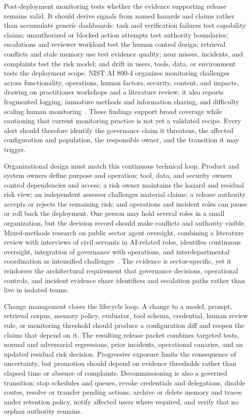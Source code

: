 Post-deployment monitoring tests whether the evidence supporting release remains valid. It should derive signals from named hazards and claims rather than accumulate generic dashboards: task and verification failures test capability claims; unauthorized or blocked action attempts test authority boundaries; escalations and reviewer workload test the human control design; retrieval conflicts and stale memory use test evidence quality; near misses, incidents, and complaints test the risk model; and drift in users, tools, data, or environment tests the deployment scope. NIST AI 800-4 organizes monitoring challenges across functionality, operations, human factors, security, content, and impacts, drawing on practitioner workshops and a literature review; it also reports fragmented logging, immature methods and information sharing, and difficulty scaling human monitoring~\cite{rao2026monitoring}. These findings support broad coverage while cautioning that current monitoring practice is not yet a validated recipe. Every alert should therefore identify the governance claim it threatens, the affected configuration and population, the responsible owner, and the transition it may trigger.

Organizational design must match this continuous technical loop. Product and system owners define purpose and operation; tool, data, and security owners control dependencies and access; a risk owner maintains the hazard and residual risk view; an independent assessor challenges material claims; a release authority accepts or rejects the remaining risk; and operations and incident roles can pause or roll back the deployment. One person may hold several roles in a small organization, but the decision record should make conflicts and authority visible. Mixed-methods research on public sector agent oversight, combining a literature review with interviews of civil servants in AI-related roles, identifies continuous oversight, integration of governance with operations, and interdepartmental coordination as intensified challenges~\cite{schmitz2025agentoversight}. The evidence is sector-specific, yet it reinforces the architectural requirement that governance decisions, operational controls, and incident evidence share identifiers and escalation paths rather than live in isolated teams.

Change management closes the lifecycle loop. A change to a model, prompt, retrieval corpus, memory policy, evaluator, tool schema, credential, human review rule, or monitoring threshold should produce a configuration diff and reopen the claims that depend on it. The resulting release packet combines targeted tests, normal and adversarial regressions, prior incidents, operational canaries, and an updated residual risk decision. Progressive exposure limits the consequence of uncertainty, but promotion should depend on evidence thresholds rather than elapsed time or absence of complaints. Decommissioning is also a governed transition: stop schedules and queues, revoke credentials and delegations, disable routes, resolve or transfer pending actions, archive or delete memory and traces under retention policy, notify affected users where required, and verify that no orphan authority remains.


